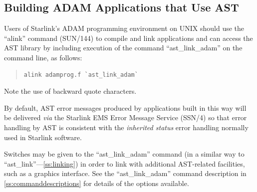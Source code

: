 \documentclass[twoside,11pt]{article}
\newcommand{\htmlref}[2]{#1}
\newcommand{\xref}[3]{#1}
\newcommand{\appref}[1]{Appendix~\ref{#1}}
\newcommand{\secref}[1]{\S\ref{#1}}
\renewcommand{\appref}[1]{\ref{#1}}
\renewcommand{\secref}[1]{\ref{#1}}
\begin{document}
\subsection{Building ADAM Applications that Use AST}

Users of Starlink's \xref{ADAM}{sg4}{} programming environment
 on UNIX should use the
``\xref{alink}{sun144}{ADAM_link_scripts}'' command
(\xref{SUN/144}{sun144}{}) to compile and link applications and can
access the AST library by including execution of the command
``\htmlref{ast\_link\_adam}{ast_link_adam}'' on the command line, as follows:

\begin{quote}
\small
\begin{verbatim}
alink adamprog.f `ast_link_adam`
\end{verbatim}
\normalsize
\end{quote}

Note the use of backward quote characters.

By default, AST error messages produced by applications built in this
way will be delivered {\em{via}} the Starlink EMS Error Message
Service (\xref{SSN/4}{ssn4}{}) so that error handling by AST is
consistent with the \xref{{\em{inherited
status}}}{sun104}{inherited_status} error handling normally used in
Starlink software.

Switches may be given to the ``ast\_link\_adam'' command (in a similar
way to ``\htmlref{ast\_link}{ast_link}''---\secref{ss:linking}) in order to link with
additional AST-related facilities, such as a graphics interface. See
the ``ast\_link\_adam'' command description in
\appref{ss:commanddescriptions} for details of the options available.

\appendix





\end{document}
